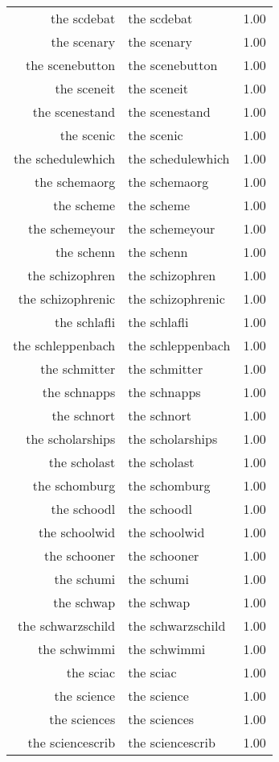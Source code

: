 \begin{table}[ht]
\begin{tabular}{rlr}
  the scdebat & the scdebat & 1.00 \\ 
  the scenary & the scenary & 1.00 \\ 
  the scenebutton & the scenebutton & 1.00 \\ 
  the sceneit & the sceneit & 1.00 \\ 
  the scenestand & the scenestand & 1.00 \\ 
  the scenic & the scenic & 1.00 \\ 
  the schedulewhich & the schedulewhich & 1.00 \\ 
  the schemaorg & the schemaorg & 1.00 \\ 
  the scheme & the scheme & 1.00 \\ 
  the schemeyour & the schemeyour & 1.00 \\ 
  the schenn & the schenn & 1.00 \\ 
  the schizophren & the schizophren & 1.00 \\ 
  the schizophrenic & the schizophrenic & 1.00 \\ 
  the schlafli & the schlafli & 1.00 \\ 
  the schleppenbach & the schleppenbach & 1.00 \\ 
  the schmitter & the schmitter & 1.00 \\ 
  the schnapps & the schnapps & 1.00 \\ 
  the schnort & the schnort & 1.00 \\ 
  the scholarships & the scholarships & 1.00 \\ 
  the scholast & the scholast & 1.00 \\ 
  the schomburg & the schomburg & 1.00 \\ 
  the schoodl & the schoodl & 1.00 \\ 
  the schoolwid & the schoolwid & 1.00 \\ 
  the schooner & the schooner & 1.00 \\ 
  the schumi & the schumi & 1.00 \\ 
  the schwap & the schwap & 1.00 \\ 
  the schwarzschild & the schwarzschild & 1.00 \\ 
  the schwimmi & the schwimmi & 1.00 \\ 
  the sciac & the sciac & 1.00 \\ 
  the science & the science & 1.00 \\ 
  the sciences & the sciences & 1.00 \\ 
  the sciencescrib & the sciencescrib & 1.00 \\ 

\end{tabular}
\end{table}
